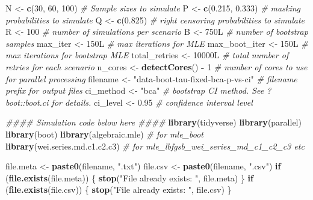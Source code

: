 \documentclass[
]{article}
\newenvironment{Shaded}{\begin{snugshade}}{\end{snugshade}}
\newcommand{\CommentTok}[1]{\textcolor[rgb]{0.56,0.35,0.01}{\textit{#1}}}
\newcommand{\ControlFlowTok}[1]{\textcolor[rgb]{0.13,0.29,0.53}{\textbf{#1}}}
\newcommand{\DecValTok}[1]{\textcolor[rgb]{0.00,0.00,0.81}{#1}}
\newcommand{\FloatTok}[1]{\textcolor[rgb]{0.00,0.00,0.81}{#1}}
\newcommand{\KeywordTok}[1]{\textcolor[rgb]{0.13,0.29,0.53}{\textbf{#1}}}
\newcommand{\NormalTok}[1]{#1}
\newcommand{\OperatorTok}[1]{\textcolor[rgb]{0.81,0.36,0.00}{\textbf{#1}}}
\newcommand{\StringTok}[1]{\textcolor[rgb]{0.31,0.60,0.02}{#1}}
\begin{document}
\begin{Shaded}
\begin{Highlighting}[]
\NormalTok{N \textless{}{-}}\StringTok{ }\KeywordTok{c}\NormalTok{(}\DecValTok{30}\NormalTok{, }\DecValTok{60}\NormalTok{, }\DecValTok{100}\NormalTok{)  }\CommentTok{\# Sample sizes to simulate}
\NormalTok{P \textless{}{-}}\StringTok{ }\KeywordTok{c}\NormalTok{(}\FloatTok{0.215}\NormalTok{, }\FloatTok{0.333}\NormalTok{)  }\CommentTok{\# masking probabilities to simulate}
\NormalTok{Q \textless{}{-}}\StringTok{ }\KeywordTok{c}\NormalTok{(}\FloatTok{0.825}\NormalTok{)  }\CommentTok{\# right censoring probabilities to simulate}
\NormalTok{R \textless{}{-}}\StringTok{ }\DecValTok{100}  \CommentTok{\# number of simulations per scenario}
\NormalTok{B \textless{}{-}}\StringTok{ }\NormalTok{750L  }\CommentTok{\# number of bootstrap samples}
\NormalTok{max\_iter \textless{}{-}}\StringTok{ }\NormalTok{150L  }\CommentTok{\# max iterations for MLE}
\NormalTok{max\_boot\_iter \textless{}{-}}\StringTok{ }\NormalTok{150L  }\CommentTok{\# max iterations for bootstrap MLE}
\NormalTok{total\_retries \textless{}{-}}\StringTok{ }\NormalTok{10000L  }\CommentTok{\# total number of retries for each scenario}
\NormalTok{n\_cores \textless{}{-}}\StringTok{ }\KeywordTok{detectCores}\NormalTok{() }\OperatorTok{{-}}\StringTok{ }\DecValTok{1}  \CommentTok{\# number of cores to use for parallel processing}
\NormalTok{filename \textless{}{-}}\StringTok{ "data{-}boot{-}tau{-}fixed{-}bca{-}p{-}vs{-}ci"}  \CommentTok{\# filename prefix for output files}
\NormalTok{ci\_method \textless{}{-}}\StringTok{ "bca"}  \CommentTok{\# bootstrap CI method. See ?boot::boot.ci for details.}
\NormalTok{ci\_level \textless{}{-}}\StringTok{ }\FloatTok{0.95}  \CommentTok{\# confidence interval level}

\CommentTok{\#\#\#\# Simulation code below here \#\#\#\#}
\KeywordTok{library}\NormalTok{(tidyverse)}
\KeywordTok{library}\NormalTok{(parallel)}
\KeywordTok{library}\NormalTok{(boot)}
\KeywordTok{library}\NormalTok{(algebraic.mle)  }\CommentTok{\# for \textasciigrave{}mle\_boot\textasciigrave{}}
\KeywordTok{library}\NormalTok{(wei.series.md.c1.c2.c3)  }\CommentTok{\# for \textasciigrave{}mle\_lbfgsb\_wei\_series\_md\_c1\_c2\_c3\textasciigrave{} etc}

\NormalTok{file.meta \textless{}{-}}\StringTok{ }\KeywordTok{paste0}\NormalTok{(filename, }\StringTok{".txt"}\NormalTok{)}
\NormalTok{file.csv \textless{}{-}}\StringTok{ }\KeywordTok{paste0}\NormalTok{(filename, }\StringTok{".csv"}\NormalTok{)}
\ControlFlowTok{if}\NormalTok{ (}\KeywordTok{file.exists}\NormalTok{(file.meta)) \{}
    \KeywordTok{stop}\NormalTok{(}\StringTok{"File already exists: "}\NormalTok{, file.meta)}
\NormalTok{\}}
\ControlFlowTok{if}\NormalTok{ (}\KeywordTok{file.exists}\NormalTok{(file.csv)) \{}
    \KeywordTok{stop}\NormalTok{(}\StringTok{"File already exists: "}\NormalTok{, file.csv)}
\NormalTok{\}}


\end{Highlighting}
\end{Shaded}
\end{document}
